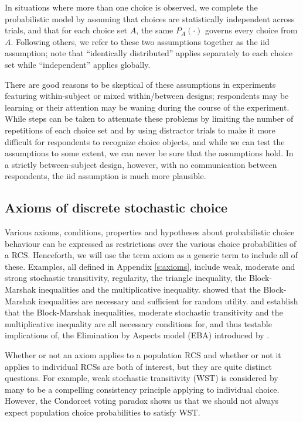 \documentclass[11pt,letter]{article}
\begin{document}
In situations where more than one choice is observed, we complete the probabilistic model by assuming that choices are statistically independent across trials, and that for each choice set $A$, the same $P_A(\cdot)$ governs every choice from $A$.
Following others, we refer to these two assumptions together as the iid assumption; note that ``identically distributed'' applies separately to each choice set while ``independent'' applies globally.

There are good reasons to be skeptical of these assumptions in experiments featuring within-subject or mixed within/between designs; respondents may be learning or their attention may be waning during the course of the experiment.
While steps can be taken to attenuate these problems by limiting the number of repetitions of each choice set and by using distractor trials to make it more difficult for respondents to recognize choice objects, and while we can test the assumptions to some extent, we can never be sure that the assumptions hold.
In a strictly between-subject design, however, with no communication between respondents, the iid assumption is much more plausible.

\subsection{Axioms of discrete stochastic choice}

Various axioms, conditions, properties and hypotheses about probabilistic choice behaviour can be expressed as restrictions over the various choice probabilities of a RCS.
Henceforth, we will use the term axiom as a generic term to include all of these.
Examples, all defined in Appendix \ref{s:axioms}, include weak, moderate and strong stochastic transitivity, regularity, the triangle inequality, the Block-Marshak inequalities and the multiplicative inequality.
 showed that the Block-Marshak inequalities are necessary and sufficient for random utility.
 and  establish that the Block-Marshak inequalities, moderate stochastic transitivity and the multiplicative inequality are all necessary conditions for, and thus testable implications of, the Elimination by Aspects model (EBA) introduced by .

Whether or not an axiom applies to a population RCS and whether or not it applies to individual RCSs are both of interest, but they are quite distinct questions.
For example, weak stochastic transitivity (WST) is considered by many to be a compelling consistency principle applying to individual choice.
However, the Condorcet voting paradox shows us that we should not always expect population choice probabilities to satisfy WST.
\end{document}
